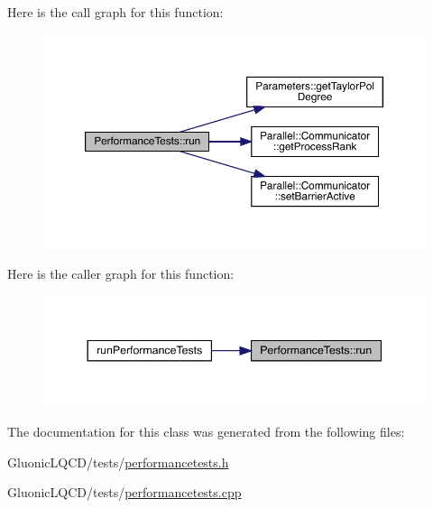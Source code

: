 Here is the call graph for this function\+:
\nopagebreak
\begin{figure}[H]
\begin{center}
\leavevmode
\includegraphics[width=350pt]{class_performance_tests_aa55ebdbc84db93cc45adfdf7163f90b4_cgraph}
\end{center}
\end{figure}
Here is the caller graph for this function\+:
\nopagebreak
\begin{figure}[H]
\begin{center}
\leavevmode
\includegraphics[width=344pt]{class_performance_tests_aa55ebdbc84db93cc45adfdf7163f90b4_icgraph}
\end{center}
\end{figure}


The documentation for this class was generated from the following files\+:\begin{DoxyCompactItemize}
\item 
Gluonic\+L\+Q\+C\+D/tests/\mbox{\hyperlink{performancetests_8h}{performancetests.\+h}}\item 
Gluonic\+L\+Q\+C\+D/tests/\mbox{\hyperlink{performancetests_8cpp}{performancetests.\+cpp}}\end{DoxyCompactItemize}
